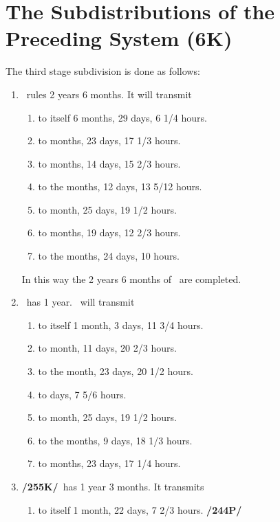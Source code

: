 \section{The Subdistributions of the Preceding System (6K)}
The third stage subdivision is done as follows:

\begin{enumerate}[label=\Roman*]
\item \Saturn\, rules 2 years 6 months. It will transmit
	\begin{enumerate}
		\item to itself 6 months, 29 days, 6 1/4 hours.
		\item to \Jupiter\xspace 2 months, 23 days, 17 1/3 hours.
		\item to \Mars\xspace 3 months, 14 days, 15 2/3 hours.
		\item to the \Sun\xspace 4 months, 12 days, 13 5/12 hours.
		\item to \Venus\xspace 1 month, 25 days, 19 1/2 hours.
		\item to \Mercury\xspace 4 months, 19 days, 12 2/3 hours.
		\item to the \Moon\xspace 5 months, 24 days, 10 hours. \\
	\end{enumerate}
	\vspace{-1em}
	In this way the 2 years 6 months of \Saturn\, are completed.
\item \Jupiter\, has 1 year. \Jupiter\, will transmit
	\begin{enumerate}
	\item to itself 1 month, 3 days, 11 3/4 hours.
	\item to \Mars\xspace 1 month, 11 days, 20 2/3 hours.
	\item to the \Sun\xspace 1 month, 23 days, 20 1/2 hours.
	\item to \Venus\xspace 22 days, 7 5/6 hours.
	\item to \Mercury\xspace 1 month, 25 days, 19 1/2 hours.
	\item to the \Moon\xspace 2 months, 9 days, 18 1/3 hours.
	\item to \Saturn\xspace 2 months, 23 days, 17 1/4 hours.
	\end{enumerate}
\item \textbf{/255K/}\Mars\, has 1 year 3 months. It transmits
	\begin{enumerate}
	\item to itself 1 month, 22 days, 7 2/3 hours. \textbf{/244P/}

\end{enumerate}
\end{enumerate}
